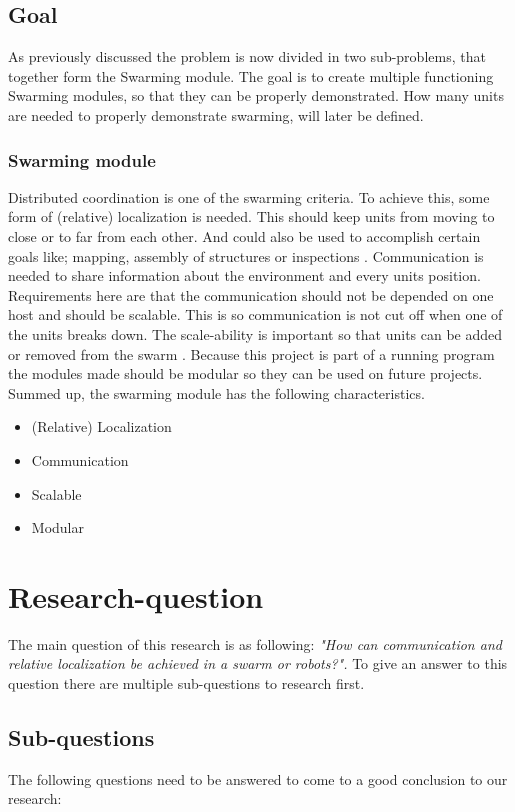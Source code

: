 \documentclass[10pt,a4paper]{article}
\begin{document}
\subsection{Goal}
As previously discussed the problem is now divided in two sub-problems, that together form the Swarming module. The goal is to create multiple functioning Swarming modules, so that they can be properly demonstrated. How many units are needed to properly demonstrate swarming, will later be defined.


\subsubsection{Swarming module}
Distributed coordination is one of the swarming criteria. To achieve this, some form of (relative) localization is needed. This should keep units from moving to close or to far from each other. And could also be used to accomplish certain goals like;  mapping, assembly of structures or inspections \cite{networkedRS}. Communication is needed to share information about the environment and every units position. Requirements here are that the communication should not be depended on one host and should be scalable. This is so communication is not cut off when one of the units breaks down. The scale-ability is important so that units can be added or removed from the swarm \cite{multidomaincom}. Because this project is part of a running program the modules made should be modular so they can be used on future projects. Summed up, the swarming module has the following characteristics.

\begin{itemize}
\item (Relative) Localization
\item Communication
\item Scalable
\item Modular
\end{itemize}

\section{Research-question}

The main question of this research is as following: \textit{"How can communication and relative localization be achieved in a swarm or robots?".} To give an answer to this question there are multiple sub-questions to research first. 
 


\subsection{Sub-questions} 
The following questions need to be answered to come to a good conclusion to our research:
\end{document}
